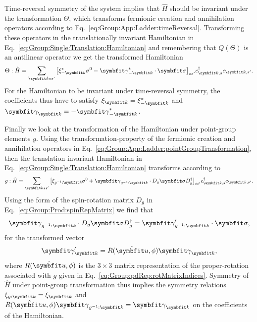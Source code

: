 Time-reversal symmetry of the system implies that $\hat{H}$ should be invariant under the transformation $\Theta$, which transforms fermionic creation and annihilation
operators according to Eq.~\eqref{eq:Group:App:Ladder:timeReversal}. Transforming these operators in the translationally invariant Hamiltonian in
Eq.~\eqref{eq:Group:Single:Translation:Hamiltonian} and remembering that $Q(\Theta)$ is an antilinear operator we get the transformed Hamiltonian
\begin{equation}
    \label{eq:Group:Single:TRS:transformedHamiltonian}
    \Theta:\hat{H} = \sum_{\v{k}ss'}\big[\xi_{-\v{k}}^\ast\sigma^0 - \v{\gamma}_{-\v{k}}^\ast\cdot\v{\sigma}\big]_{ss'}c^\dagger_{\v{k},s}c_{\v{k},s'}.
\end{equation}
For the Hamiltonian to be invariant under time-reversal symmetry, the coefficients thus have to satisfy $\xi_\v{k} = \xi_{-\v{k}}^\ast$ and
$\v{\gamma}_\v{k} = -\v{\gamma}_{-\v{k}}^\ast$.

Finally we look at the transformation of the Hamiltonian under point-group elements $g$. Using the transformation-property of the fermionic creation and
annihilation operators in Eq.~\eqref{eq:Group:App:Ladder:pointGroupTransformation}, then the translation-invariant Hamiltonian in
Eq.~\eqref{eq:Group:Single:Translation:Hamiltonian} transforms according to
\begin{equation}
    \label{eq:Group:Single:Point:transformedHamiltonian}
    g:\hat{H} = \sum_{\v{k}ss'}\big[\xi_{g^{-1}:\v{k}}\sigma^0 + \v{\gamma}_{g^{-1}:\v{k}}\cdot D_g\v{\sigma}D_g^\dagger\big]_{ss'}c^\dagger_{\v{k},s}c_{\v{k},s'}.
\end{equation}
Using the form of the spin-rotation matrix $D_g$ in Eq.~\eqref{eq:Group:Prod:spinRepMatrix} we find that
\begin{equation}
    \label{eq:Group:Single:Point:sigmaTransform}
    \v{\gamma}_{g^{-1}:\v{k}}\cdot D_g\v{\sigma}D_g^\dagger = \v{\gamma}'_{g^{-1}:\v{k}}\cdot\v{\sigma},
\end{equation}
for the transformed vector
\begin{equation}
    \label{eq:Group:Single:point:transformedVector}
    \v{\gamma}'_{\v{k}} = R(\hat{\v{u}},\phi)\v{\gamma}_\v{k},
\end{equation}
where $R(\hat{\v{u}},\phi)$ is the $3\times3$ matrix representation of the proper-rotation associated with $g$ given in
Eq.~\eqref{eq:Group:pdRep:rotMatrixIndices}. Symmetry of $\hat{H}$ under point-group transformation thus implies the symmetry relations $\xi_{g:\v{k}} = \xi_{\v{k}}$
and $R(\hat{\v{u}},\phi)\v{\gamma}_{g^{-1}:\v{k}} = \v{\gamma}_\v{k}$ on the coefficients of the Hamiltonian.


